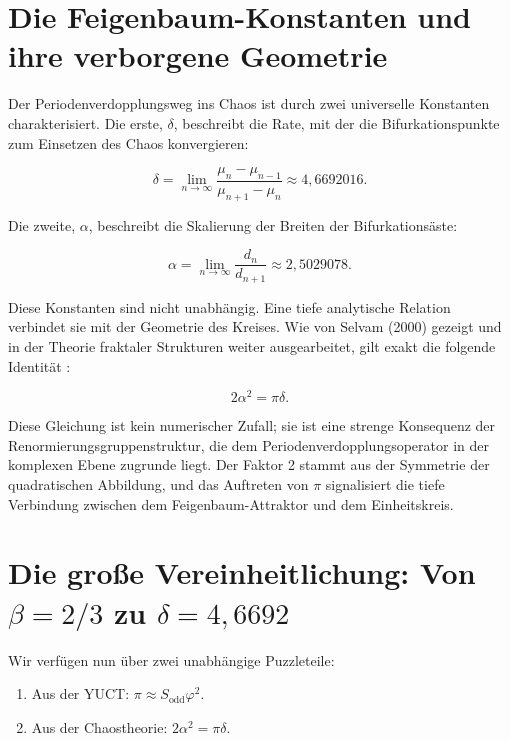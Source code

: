 \documentclass[12pt,a4paper]{article}
\begin{document}
	\section{Die Feigenbaum-Konstanten und ihre verborgene Geometrie}
	
	Der Periodenverdopplungsweg ins Chaos ist durch zwei universelle Konstanten charakterisiert. Die erste, \(\delta\), beschreibt die Rate, mit der die Bifurkationspunkte zum Einsetzen des Chaos konvergieren:
	
	\begin{equation}
		\delta = \lim_{n\to\infty} \frac{\mu_n - \mu_{n-1}}{\mu_{n+1} - \mu_n} \approx 4{,}6692016.
	\end{equation}
	
	Die zweite, \(\alpha\), beschreibt die Skalierung der Breiten der Bifurkationsäste:
	
	\begin{equation}
		\alpha = \lim_{n\to\infty} \frac{d_n}{d_{n+1}} \approx 2{,}5029078.
	\end{equation}
	
	Diese Konstanten sind nicht unabhängig. Eine tiefe analytische Relation verbindet sie mit der Geometrie des Kreises. Wie von Selvam (2000) gezeigt und in der Theorie fraktaler Strukturen weiter ausgearbeitet, gilt exakt die folgende Identität \cite{Selvam2000}:
	
	\begin{equation}
		2\alpha^2 = \pi \delta.
		\label{eq:feigenbaum-pi}
	\end{equation}
	
	Diese Gleichung ist kein numerischer Zufall; sie ist eine strenge Konsequenz der Renormierungsgruppenstruktur, die dem Periodenverdopplungsoperator in der komplexen Ebene zugrunde liegt. Der Faktor 2 stammt aus der Symmetrie der quadratischen Abbildung, und das Auftreten von \(\pi\) signalisiert die tiefe Verbindung zwischen dem Feigenbaum-Attraktor und dem Einheitskreis.
	
	\section{Die große Vereinheitlichung: Von \(\beta = 2/3\) zu \(\delta = 4{,}6692\)}
	
	Wir verfügen nun über zwei unabhängige Puzzleteile:
	\begin{enumerate}
		\item Aus der YUCT: \(\pi \approx S_{\mathrm{odd}}\varphi^2\).
		\item Aus der Chaostheorie: \(2\alpha^2 = \pi \delta\).
	\end{enumerate}
	
\end{document}
